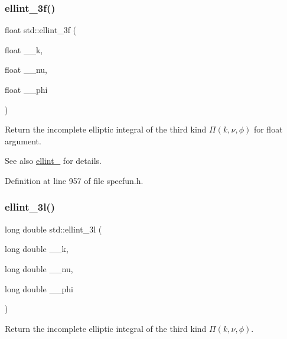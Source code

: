 \subsubsection{\texorpdfstring{ellint\+\_\+3f()}{ellint\_3f()}}
{\footnotesize\ttfamily float std\+::ellint\+\_\+3f (\begin{DoxyParamCaption}\item[{float}]{\+\_\+\+\_\+k,  }\item[{float}]{\+\_\+\+\_\+nu,  }\item[{float}]{\+\_\+\+\_\+phi }\end{DoxyParamCaption})\hspace{0.3cm}{\ttfamily [inline]}}



Return the incomplete elliptic integral of the third kind $ \Pi(k,\nu,\phi) $ for {\ttfamily float} argument. 

\begin{DoxySeeAlso}{See also}
\hyperlink{group__tr29124__math__spec__func_ga3af251108b5384ca1f27350e47c8108e}{ellint\+\_} for details. 
\end{DoxySeeAlso}


Definition at line 957 of file specfun.\+h.

\mbox{\label{group__tr29124__math__spec__func_gaa8c0e5864df8769021a7f3e21a30c5d2}} 
\subsubsection{\texorpdfstring{ellint\+\_\+3l()}{ellint\_3l()}}
{\footnotesize\ttfamily long double std\+::ellint\+\_\+3l (\begin{DoxyParamCaption}\item[{long double}]{\+\_\+\+\_\+k,  }\item[{long double}]{\+\_\+\+\_\+nu,  }\item[{long double}]{\+\_\+\+\_\+phi }\end{DoxyParamCaption})\hspace{0.3cm}{\ttfamily [inline]}}



Return the incomplete elliptic integral of the third kind $ \Pi(k,\nu,\phi) $. 

